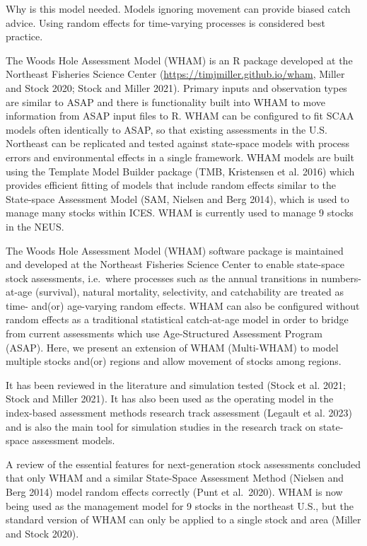 \documentclass[
]{article}
\begin{document}
Why is this model needed. Models ignoring movement can provide biased
catch advice. Using random effects for time-varying processes is
considered best practice.

The Woods Hole Assessment Model (WHAM) is an R package developed at the
Northeast Fisheries Science Center
(\url{https://timjmiller.github.io/wham}, Miller and Stock 2020; Stock
and Miller 2021). Primary inputs and observation types are similar to
ASAP and there is functionality built into WHAM to move information from
ASAP input files to R. WHAM can be configured to fit SCAA models often
identically to ASAP, so that existing assessments in the U.S. Northeast
can be replicated and tested against state-space models with process
errors and environmental effects in a single framework. WHAM models are
built using the Template Model Builder package (TMB, Kristensen et al.
2016) which provides efficient fitting of models that include random
effects similar to the State-space Assessment Model (SAM, Nielsen and
Berg 2014), which is used to manage many stocks within ICES. WHAM is
currently used to manage 9 stocks in the NEUS.

The Woods Hole Assessment Model (WHAM) software package is maintained
and developed at the Northeast Fisheries Science Center to enable
state-space stock assessments, i.e.~where processes such as the annual
transitions in numbers-at-age (survival), natural mortality,
selectivity, and catchability are treated as time- and(or) age-varying
random effects. WHAM can also be configured without random effects as a
traditional statistical catch-at-age model in order to bridge from
current assessments which use Age-Structured Assessment Program (ASAP).
Here, we present an extension of WHAM (Multi-WHAM) to model multiple
stocks and(or) regions and allow movement of stocks among regions.

It has been reviewed in the literature and simulation tested (Stock et
al. 2021; Stock and Miller 2021). It has also been used as the operating
model in the index-based assessment methods research track assessment
(Legault et al. 2023) and is also the main tool for simulation studies
in the research track on state-space assessment models.

A review of the essential features for next-generation stock assessments
concluded that only WHAM and a similar State-Space Assessment Method
(Nielsen and Berg 2014) model random effects correctly (Punt et
al.~2020). WHAM is now being used as the management model for 9 stocks
in the northeast U.S., but the standard version of WHAM can only be
applied to a single stock and area (Miller and Stock 2020).
\end{document}
